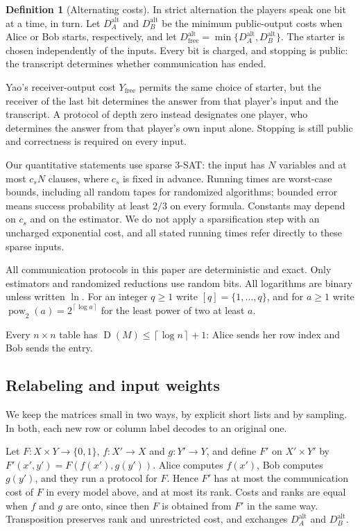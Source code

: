 \documentclass[11pt,letterpaper]{article} \usepackage[utf8]{inputenc}
\theoremstyle{plain} \newtheorem{theorem}{Theorem}[section]
\theoremstyle{definition} \newaliascnt{definition}{theorem}
\newtheorem{definition}[definition]{Definition} \aliascntresetthe{definition}
\newcommand{\D}{\operatorname{D}}
\newcommand{\ceil}[1]{\left\lceil#1\right\rceil}
\begin{document}
\begin{definition}[Alternating costs]\label{yao:model}
In strict alternation the players speak one bit at a time, in turn.
Let $D_A^{\mathrm{alt}}$ and $D_B^{\mathrm{alt}}$ be the minimum
public-output costs when Alice or Bob starts, respectively, and let
$D_{\mathrm{free}}^{\mathrm{alt}}=\min\{D_A^{\mathrm{alt}},D_B^{\mathrm{alt}}\}$.
The starter is chosen independently of the inputs. Every bit is charged,
and stopping is public: the transcript determines whether communication
has ended.

Yao's receiver-output cost $Y_{\mathrm{free}}$ permits the same choice of
starter, but the receiver of the last bit determines the answer from
that player's input and the transcript. A protocol of depth zero instead designates one
player, who determines the answer from that player's own input alone. Stopping is
still public and correctness is required on every input.
\end{definition}

Our quantitative statements use sparse $3$-SAT: the input has $N$ variables
and at most $c_sN$ clauses, where $c_s$ is fixed in advance. Running times
are worst-case bounds, including all random tapes for randomized algorithms;
bounded error means success probability at least $2/3$ on every formula.
Constants may depend on $c_s$ and on the estimator. We do not apply a
sparsification step with an uncharged exponential cost, and all stated running
times refer directly to these sparse inputs.

All communication protocols in this paper are deterministic and exact.
Only estimators and randomized reductions use random bits. All logarithms
are binary unless written $\ln$. For an integer $q\ge1$ write $[q]=\{1,\ldots,q\}$, and for $a\ge1$ write
$\operatorname{pow}_2(a)=2^{\ceil{\log a}}$ for the least power of two
at least $a$.

Every $n\times n$ table has $\D(M)\le\ceil{\log n}+1$: Alice sends her
row index and Bob sends the entry.

\subsection{Relabeling and input weights}

We keep the matrices small in two ways, by explicit short lists and by
sampling. In both, each new row or column label decodes to an original one.

Let $F:X\times Y\to\{0,1\}$, $f:X'\to X$ and $g:Y'\to Y$, and define $F'$ on $X'\times Y'$ by
$F'(x',y')=F(f(x'),g(y'))$. Alice computes $f(x')$, Bob computes $g(y')$,
and they run a protocol for $F$. Hence $F'$ has at most the
communication cost of $F$ in every model above, and at most its rank. Costs and ranks
are equal when $f$ and $g$ are onto, since then $F$ is obtained from $F'$ in the same way. Transposition preserves rank and unrestricted
cost, and exchanges $D_A^{\mathrm{alt}}$ and $D_B^{\mathrm{alt}}$.
\end{document}
